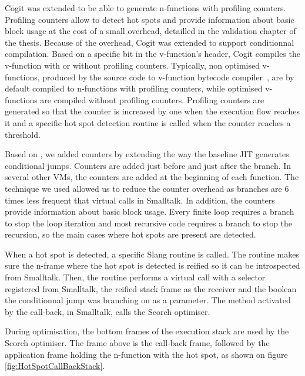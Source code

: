 \documentclass[a4paper,12pt,twoside]{../includes/ThesisStyle}
\begin{document}
Cogit was extended to be able to generate n-functions with profiling counters. Profiling counters allow to detect hot spots and provide information about basic block usage at the cost of a small overhead, detailled in the validation chapter of the thesis. Because of the overhead, Cogit was extended to support conditionnal compilation. Based on a specific bit in the v-function's header, Cogit compiles the v-function with or without profiling counters. Typically, non optimised v-functions, produced by the source code to v-function bytecode compiler~\cite{Bera13a}, are by default compiled to n-functions with profiling counters, while optimised v-functions are compiled without profiling counters. Profiling counters are generated so that the counter is increased by one when the execution flow reaches it and a specific hot spot detection routine is called when the counter reaches a threshold.


Based on \cite{Arn02}, we added counters by extending the way the baseline JIT generates conditional jumps. Counters are added just before and just after the branch. In several other VMs, the counters are added at the beginning of each function. The technique we used allowed us to reduce the counter overhead as branches are 6 times less frequent that virtual calls in Smalltalk. In addition, the counters provide information about basic block usage. Every finite loop requires a branch to stop the loop iteration and most recursive code requires a branch to stop the recursion, so the main cases where hot spots are present are detected.

When a hot spot is detected, a specific Slang routine is called. The routine makes sure the n-frame where the hot spot is detected is reified so it can be introspected from Smalltalk. Then, the routine performs a virtual call with a selector registered from Smalltalk, the reified stack frame as the receiver and the boolean the conditionnal jump was branching on as a parameter. The method activated by the call-back, in Smalltalk, calls the Scorch optimiser.

During optimisation, the bottom frames of the execution stack are used by the Scorch optimiser. The frame above is the call-back frame, followed by the application frame holding the n-function with the hot spot, as shown on figure \ref{fig:HotSpotCallBackStack}.
\end{document}
